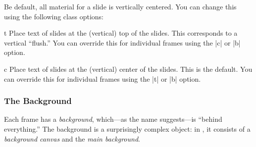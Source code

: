 
Be default, all material for a slide is vertically centered. You can
change this using the following class options:

\begin{classoption}{t}
  Place text of slides at the (vertical) top of the slides. This
  corresponds to a vertical ``flush.'' You can override this for
  individual frames using the |c| or |b| option.
\end{classoption}

\begin{classoption}{c}
  Place text of slides at the (vertical) center of the slides. This is
  the default. You can override this for
  individual frames using the |t| or |b| option.
\end{classoption}


\subsubsection{The Background}
\label{section-canvas}
\label{section-background}

Each frame has a \emph{background}, which---as the name suggests---is
``behind everything.'' The background is a surprisingly complex
object: in \beamer, it consists of a \emph{background canvas} and the
\emph{main background}.


